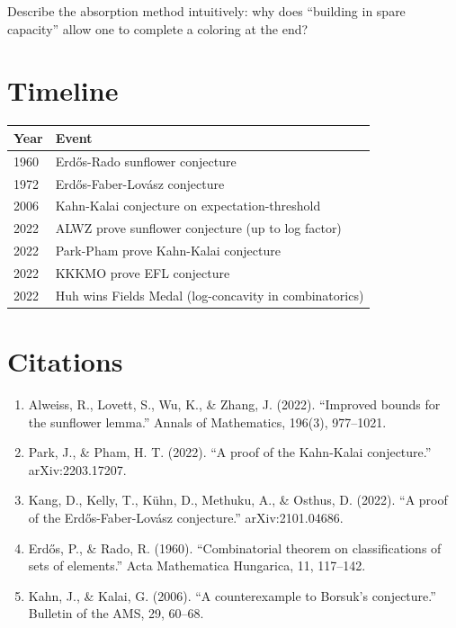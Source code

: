 \begin{exercise}[Challenge]
Describe the absorption method intuitively: why does ``building in spare capacity'' allow one to complete a coloring at the end?
\end{exercise}

\section{Timeline}

\begin{tabularx}{\linewidth}{lX}
\toprule
\textbf{Year} & \textbf{Event} \\ \midrule
1960 & Erd\H{o}s-Rado sunflower conjecture \\
1972 & Erd\H{o}s-Faber-Lov\'{a}sz conjecture \\
2006 & Kahn-Kalai conjecture on expectation-threshold \\
2022 & ALWZ prove sunflower conjecture (up to log factor) \\
2022 & Park-Pham prove Kahn-Kalai conjecture \\
2022 & KKKMO prove EFL conjecture \\
2022 & Huh wins Fields Medal (log-concavity in combinatorics) \\
\bottomrule
\end{tabularx}

\section{Citations}

\begin{enumerate}
\item Alweiss, R., Lovett, S., Wu, K., \& Zhang, J. (2022). ``Improved bounds for the sunflower lemma.'' Annals of Mathematics, 196(3), 977--1021.
\item Park, J., \& Pham, H. T. (2022). ``A proof of the Kahn-Kalai conjecture.'' arXiv:2203.17207.
\item Kang, D., Kelly, T., K\"{u}hn, D., Methuku, A., \& Osthus, D. (2022). ``A proof of the Erd\H{o}s-Faber-Lov\'{a}sz conjecture.'' arXiv:2101.04686.
\item Erd\H{o}s, P., \& Rado, R. (1960). ``Combinatorial theorem on classifications of sets of elements.'' Acta Mathematica Hungarica, 11, 117--142.
\item Kahn, J., \& Kalai, G. (2006). ``A counterexample to Borsuk's conjecture.'' Bulletin of the AMS, 29, 60--68.
\end{enumerate}

